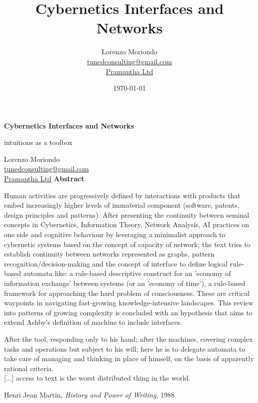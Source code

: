 \documentclass[14pt]{extarticle}
\title{Cybernetics Interfaces and Networks}%
\author{Lorenzo Moriondo \\ \href{mailto:tunedconsulting@gmail.com}{tunedconsulting@gmail.com} \\ \href{https://pramantha.net}{Pramantha Ltd}}%
\date{\today}%
\begin{document}
%

\begin{titlepage}
	\begin{center}
    	\vspace*{1cm}
        \Huge
        \textbf{Cybernetics Interfaces and Networks}%

        \vspace{0.5cm}
        \LARGE{intuitions as a toolbox}
            
        \vspace{1.5cm}

        \normalsize{Lorenzo Moriondo \\ \href{mailto:tunedconsulting@gmail.com}{tunedconsulting@gmail.com} \\ \href{https://pramantha.net}{Pramantha Ltd}}
        \vfill
        \textbf{Abstract}
	\end{center}   
    \vspace{3mm}

	Human activities are progressively defined by interactions with products that embed increasingly higher levels of immaterial component (software, patents, design principles and patterns). After presenting the continuity between seminal concepts in Cybernetics, Information Theory, Network Analysis, AI practices on one side and cognitive behaviour by leveraging a minimalist approach to cybernetic systems based on the concept of capacity of network; the text tries to establish continuity between networks represented as graphs, pattern recognition/decision-making and the concept of interface to define logical rule-based automata like: a rule-based descriptive construct for an 'economy of information exchange' between systems (or an 'economy of time'), a rule-based framework for approaching the hard problem of consciousness. These are critical waypoints in navigating fast-growing knowledge-intensive landscapes. This review into patterns of growing complexity is concluded with an hypothesis that aims to extend Ashby's definition of machine to include interfaces.
\end{titlepage}%

\newpage

\pagestyle{header}%

\epigraph{
After the tool, responding only to his hand; after the machines, covering complex tasks and operations but subject to his will; here he is to delegate automata to take care of managing and thinking in place of himself, on the basis of apparently rational criteria.\\
\vspace{5mm}
[...] access to text is the worst distributed thing in the world.
}{Henri Jean Martin, \textit{History and Power of Writing}, 1988}
\end{document}
